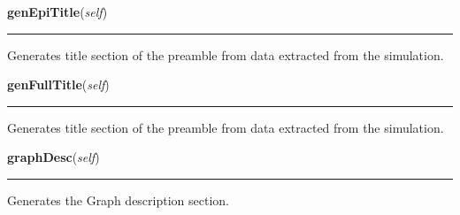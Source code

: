     \vspace{0.5ex}

    \begin{boxedminipage}{\textwidth}

    \raggedright \textbf{genEpiTitle}(\textit{self})

    \vspace{-1.5ex}

    \rule{\textwidth}{0.5\fboxrule}
    Generates title section of the preamble from data extracted from the 
    simulation.

    \vspace{1ex}

    \end{boxedminipage}

    \label{Epigrass:report:report:genFullTitle}

    \vspace{0.5ex}

    \begin{boxedminipage}{\textwidth}

    \raggedright \textbf{genFullTitle}(\textit{self})

    \vspace{-1.5ex}

    \rule{\textwidth}{0.5\fboxrule}
    Generates title section of the preamble from data extracted from the 
    simulation.

    \vspace{1ex}

    \end{boxedminipage}

    \label{Epigrass:report:report:graphDesc}

    \vspace{0.5ex}

    \begin{boxedminipage}{\textwidth}

    \raggedright \textbf{graphDesc}(\textit{self})

    \vspace{-1.5ex}

    \rule{\textwidth}{0.5\fboxrule}
    Generates the Graph description section.

    \vspace{1ex}

    \end{boxedminipage}

